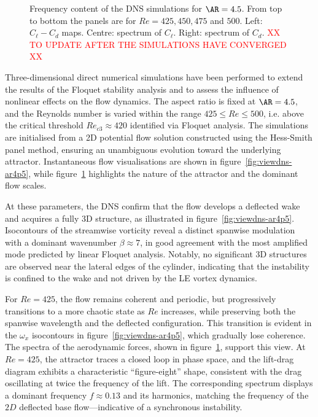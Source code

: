 \begin{figure}
  \caption{Frequency content of the DNS simulations for $\AR=4.5$. From top to bottom the panels are for $Re=425,450,475$ and $500$. Left: $C_\ell-C_d$ maps. Centre: spectrum of $C_\ell$. Right: spectrum of $C_d$. \textcolor{red}{XX TO UPDATE AFTER THE SIMULATIONS HAVE CONVERGED XX}}
  \label{fig:clcddns-ar4p5}
\end{figure} 

Three-dimensional direct numerical simulations have been performed to extend the results of the Floquet stability analysis and to assess the influence of nonlinear effects on the flow dynamics. The aspect ratio is fixed at $\AR = 4.5$, and the Reynolds number is varied within the range $425 \le Re \le 500$, i.e. above the critical threshold $Re_{c3} \approx 420$ identified via Floquet analysis. The simulations are initialised from a 2D potential flow solution constructed using the Hess-Smith panel method, ensuring an unambiguous evolution toward the underlying attractor. Instantaneous flow visualisations are shown in figure~\ref{fig:viewdns-ar4p5}, while figure~\ref{fig:clcddns-ar4p5} highlights the nature of the attractor and the dominant flow scales.

At these parameters, the DNS confirm that the flow develops a deflected wake and acquires a fully 3D structure, as illustrated in figure~\ref{fig:viewdns-ar4p5}. Isocontours of the streamwise vorticity reveal a distinct spanwise modulation with a dominant wavenumber $\beta \approx 7$, in good agreement with the most amplified mode predicted by linear Floquet analysis. Notably, no significant 3D structures are observed near the lateral edges of the cylinder, indicating that the instability is confined to the wake and not driven by the LE vortex dynamics.

For $Re = 425$, the flow remains coherent and periodic, but progressively transitions to a more chaotic state as $Re$ increases, while preserving both the spanwise wavelength and the deflected configuration. This transition is evident in the $\omega_x$ isocontours in figure~\ref{fig:viewdns-ar4p5}, which gradually lose coherence. The spectra of the aerodynamic forces, shown in figure~\ref{fig:clcddns-ar4p5}, support this view. At $Re = 425$, the attractor traces a closed loop in phase space, and the lift-drag diagram exhibits a characteristic ``figure-eight'' shape, consistent with the drag oscillating at twice the frequency of the lift. The corresponding spectrum displays a dominant frequency $f \approx 0.13$ and its harmonics, matching the frequency of the $2D$ deflected base flow—indicative of a synchronous instability.

